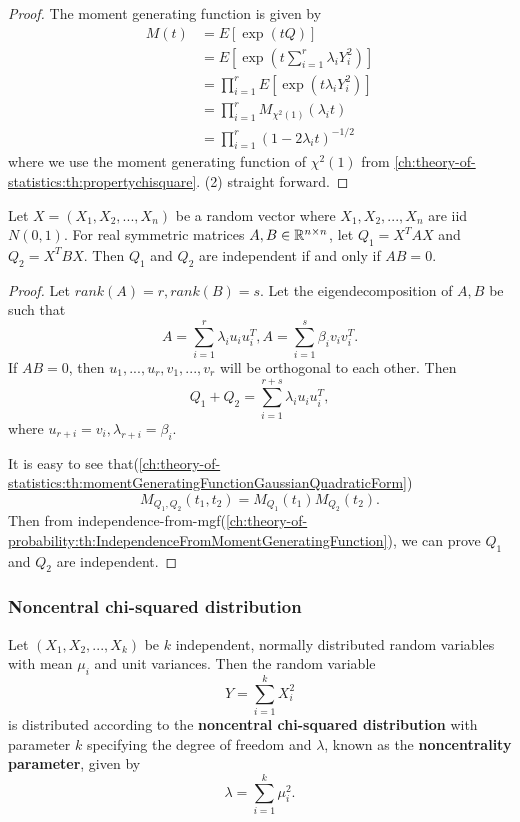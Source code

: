 \begin{refsection}
\begin{proof}
The moment generating function is given by
\begin{align*}
M(t) &= E[\exp(tQ )] \\
&= E[\exp(t \sum_{i=1}^r \lambda_i Y_i^2 )] \\
&= \prod_{i=1}^r E[\exp(t \lambda_i Y_i^2 )] \\
&= \prod_{i=1}^r M_{\chi^2(1)}(\lambda_it) \\
& = \prod_{i=1}^r (1 - 2\lambda_i t)^{-1/2}
\end{align*}
where we use the moment generating function of $\chi^2(1)$ from \autoref{ch:theory-of-statistics:th:propertychisquare}.
(2) straight forward. 
\end{proof}



\begin{lemma}\label{ch:theory-of-statistics:th:independenceOfChiSquareQuadraticForms}\cite[528]{hoggintroduction}
Let $X=(X_1,X_2,...,X_n)$ be a random vector where $X_1,X_2,...,X_n$ are iid $N(0,1)$. For real symmetric matrices $A,B\in \mathbb{R}^{n\times n}$, let $Q_1 = X^TAX$ and $Q_2 = X^TBX$. Then $Q_1$ and $Q_2$ are independent if and only if $AB = 0$.	
\end{lemma}
\begin{proof}
Let $rank(A) = r, rank(B) = s$. Let the eigendecomposition of $A,B$ be such that
$$A = \sum_{i=1}^r \lambda_i u_iu_i^T,A = \sum_{i=1}^s 
\beta_i v_iv_i^T.$$
If $AB = 0$, then $u_1,...,u_r, v_1,...,v_r$ will be orthogonal to each other. Then
$$Q_1+Q_2 = \sum_{i=1}^{r+s} \lambda_i u_iu_i^T,$$
where $u_{r+i} = v_i, \lambda_{r+i} = \beta_i$.

It is easy to see that(\autoref{ch:theory-of-statistics:th:momentGeneratingFunctionGaussianQuadraticForm}) 
$$M_{Q_1,Q_2}(t_1,t_2) = M_{Q_1}(t_1)M_{Q_2}(t_2).$$
Then from independence-from-mgf(\autoref{ch:theory-of-probability:th:IndependenceFromMomentGeneratingFunction}), we can prove $Q_1$ and $Q_2$ are independent.
	
\end{proof}

\subsubsection{Noncentral chi-squared distribution}
\begin{definition} Let $(X_1,X_2,...,X_k)$ be $k$ independent, normally distributed random variables with mean $\mu_i$ and unit variances. Then the random variable 
	$$Y = \sum_{i=1}^{k}X_i^2$$
is distributed according to the \textbf{noncentral chi-squared distribution} with parameter $k$ specifying the degree of freedom and $\lambda$, known as the \textbf{noncentrality parameter}, given by
$$\lambda = \sum_{i=1}^k \mu_i^2.$$	
\end{definition}


\end{refsection}

